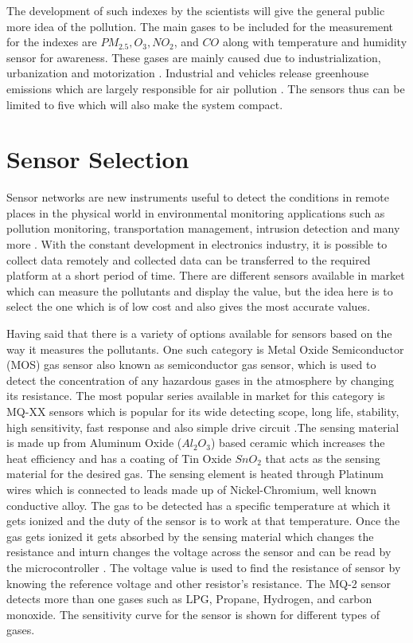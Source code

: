 \documentclass[11pt]{article}
\begin{document}
The development of such indexes by the scientists will give the general public more idea of the pollution. The main gases to be included for the measurement for the indexes are  $PM_{2.5}, O_3, NO_2$, and $CO$ along with temperature and humidity sensor for awareness. These gases are mainly caused due to industrialization, urbanization and motorization \cite{Saha1952}. Industrial and vehicles release greenhouse emissions which are largely responsible for air pollution \cite{ internet}. The sensors thus can be limited to five which will also make the system compact.


   \section*{Sensor Selection} 
    
    Sensor networks are new instruments useful to detect the conditions in remote places in the physical world in environmental monitoring applications such as pollution monitoring, transportation management, intrusion detection and many more \cite{Jung2011}. With the constant development in electronics industry, it is possible to collect data remotely and collected data can be transferred to the required platform at a short period of time.
    There are different sensors available in market which can measure the pollutants and display the value, but the idea here is to select the one which is of low cost and also gives the most accurate values.
    \par
    Having said that there is a variety of options available for sensors based on the way it measures the pollutants. One such category is Metal Oxide Semiconductor (MOS) gas sensor also known as semiconductor gas sensor, which is used to detect the concentration of any hazardous gases in the atmosphere by changing its resistance. The most popular series available in market for this category is MQ-XX sensors which is popular for its wide detecting scope, long life, stability, high sensitivity, fast response and also simple drive circuit \cite{Data2012}.The sensing material is made up from Aluminum Oxide ($ Al_{2}O_{3}$) based ceramic which increases the heat efficiency and has a coating of Tin Oxide $ SnO_{2} $ that acts as the sensing material for the desired gas. The sensing element is heated through Platinum wires which is connected to leads made up of Nickel-Chromium, well known conductive alloy. The gas to be detected has a specific temperature at which it gets ionized and the duty of the sensor is to work at that temperature. Once the gas gets ionized it gets absorbed by the sensing material which changes the resistance and inturn changes the voltage across the sensor and can be read by the microcontroller \cite{gassensor}. The voltage value is used to find the resistance of sensor by knowing the reference voltage and other resistor's resistance. The MQ-2 sensor detects more than one gases such as LPG, Propane, Hydrogen, and carbon monoxide. The sensitivity curve for the sensor is shown for different types of gases.
\end{document}
